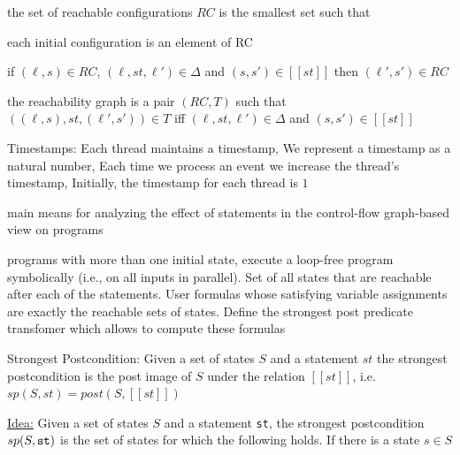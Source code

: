 \documentclass[landscape, a4paper]{article}
\begin{document}
\begin{minipage}[t]{0.2\linewidth}
\begin{betterlist}
	\end{betterlist}
	\begin{betterlist}
		\item the \alert{set of reachable configurations $RC$} is the smallest set such that
		\begin{betterlist}
			\item each initial configuration is an element of RC
			\item if $(\ell, s) \in RC$, $(\ell, st, \ell') \in \Delta$ and $(s, s') \in [[st]]$ then $(\ell', s') \in RC$
		\end{betterlist}
		\item \color{orange}the \alert{reachability graph} is a pair $(RC, T)$ such that $((\ell, s), st, (\ell', s')) \in T$ iff $(\ell, st, \ell') \in \Delta$ and $(s, s') \in [[st]]$\color{black}
		\item \alert{Timestamps:} Each thread maintains a timestamp, We represent a timestamp as a natural number, Each time we process an event we increase the thread’s timestamp, Initially, the timestamp for each thread is $1$
		\begin{betterlist}
			\item {}
			\item {}
		\end{betterlist}
	\end{betterlist}
	\fbox{Predicate Transformers}
	\begin{betterlist}
		\item main means for analyzing the effect of statements in the control-flow graph-based view on programs
		\item programs with more than one initial state, execute a loop-free program symbolically (i.e., on all inputs in parallel). Set of all states that are reachable after each of the statements. User formulas whose satisfying variable assignments are exactly the reachable sets of states. Define the \alert{strongest post predicate transfomer} which allows to compute these formulas
		\item \color{orange}\alert{Strongest Postcondition:} Given a set of states $S$ and a statement $st$ the strongest postcondition is the post image of $S$ under the relation $[[st]]$, i.e. $sp(S, st) = post(S, [[st]])$
		\begin{betterlist}
			\item \underline{Idea:} Given a set of states $S$ and a statement \verb|st|, the strongest postcondition $sp(S, \verb|st|)$ is the set of states for which the following holds. If there is a state $s \in S$

\end{betterlist}
\end{betterlist}
\end{minipage}
\end{document}
